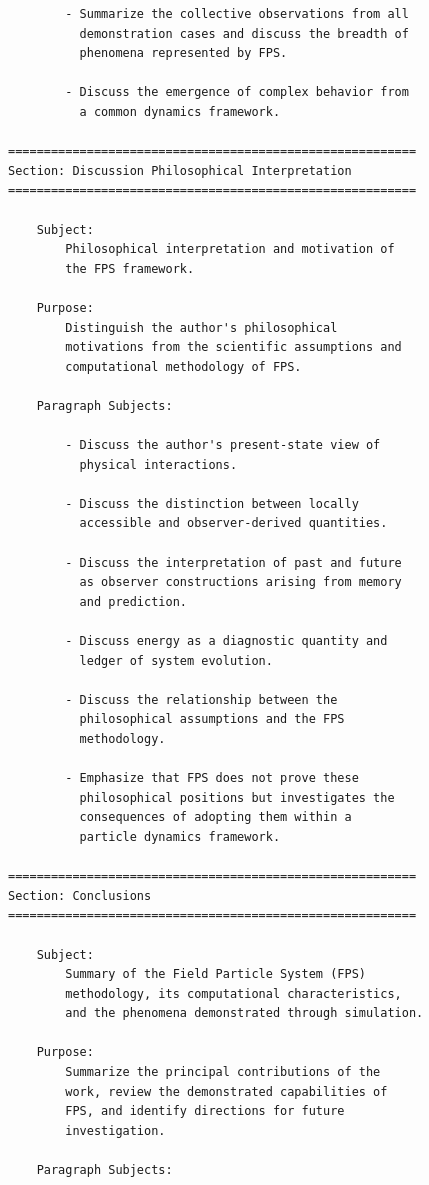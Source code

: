 \begin{verbatim}
        - Summarize the collective observations from all
          demonstration cases and discuss the breadth of
          phenomena represented by FPS.
		  
		- Discuss the emergence of complex behavior from
		  a common dynamics framework.

=========================================================
Section: Discussion Philosophical Interpretation
=========================================================

    Subject:
        Philosophical interpretation and motivation of
        the FPS framework.

    Purpose:
        Distinguish the author's philosophical
        motivations from the scientific assumptions and
        computational methodology of FPS.

    Paragraph Subjects:

        - Discuss the author's present-state view of
          physical interactions.

        - Discuss the distinction between locally
          accessible and observer-derived quantities.

        - Discuss the interpretation of past and future
          as observer constructions arising from memory
          and prediction.

        - Discuss energy as a diagnostic quantity and
          ledger of system evolution.

        - Discuss the relationship between the
          philosophical assumptions and the FPS
          methodology.

        - Emphasize that FPS does not prove these
          philosophical positions but investigates the
          consequences of adopting them within a
          particle dynamics framework.

=========================================================
Section: Conclusions
=========================================================

    Subject:
        Summary of the Field Particle System (FPS)
        methodology, its computational characteristics,
        and the phenomena demonstrated through simulation.

    Purpose:
        Summarize the principal contributions of the
        work, review the demonstrated capabilities of
        FPS, and identify directions for future
        investigation.

    Paragraph Subjects:


\end{verbatim}
